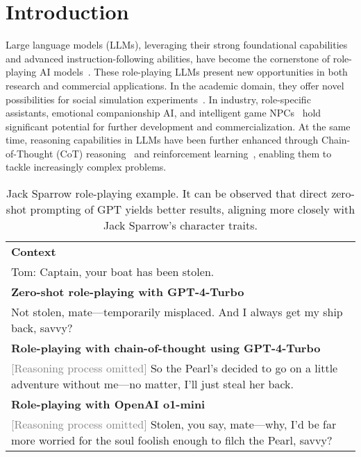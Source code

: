 \section{Introduction}


Large language models (LLMs), leveraging their strong foundational capabilities and advanced instruction-following abilities, have become the cornerstone of role-playing AI models~\citep{chen2024persona,tseng2024two}.
These role-playing LLMs present new opportunities in both research and commercial applications. 
In the academic domain, they offer novel possibilities for social simulation experiments~\citep{mou2024individual}. 
In industry, role-specific assistants, emotional companionship AI, and intelligent game NPCs~\citep{park2023generative,xu2024can} hold significant potential for further development and commercialization.
At the same time, reasoning capabilities in LLMs have been further enhanced through Chain-of-Thought (CoT) reasoning~\citep{wei2022chain} and reinforcement learning~\citep{guo2025deepseek}, enabling them to tackle increasingly complex problems.


\begin{table}[t]
    \centering
    \begin{tabularx}{\columnwidth}{X}
        \toprule
        \textbf{Context}  \\
        Tom: Captain, your boat has been stolen. \\
        \midrule
        \textbf{Zero-shot role-playing with GPT-4-Turbo} \\
        Not stolen, mate—temporarily misplaced. And I always get my ship back, savvy? \\
        \hdashline
        \textbf{Role-playing with chain-of-thought using GPT-4-Turbo} \\
        \textcolor{gray}{[Reasoning process omitted]}  So the Pearl's decided to go on a little adventure without me—no matter, I’ll just steal her back. \\
        \hdashline
        \textbf{Role-playing with OpenAI o1-mini} \\
        \textcolor{gray}{[Reasoning process omitted]}  Stolen, you say, mate—why, I'd be far more worried for the soul foolish enough to filch the Pearl, savvy? \\
        \bottomrule
    \end{tabularx}
    \caption{Jack Sparrow role-playing example. It can be observed that direct zero-shot prompting of GPT yields better results, aligning more closely with Jack Sparrow's character traits.}
    \label{tab:intro}
\end{table}


